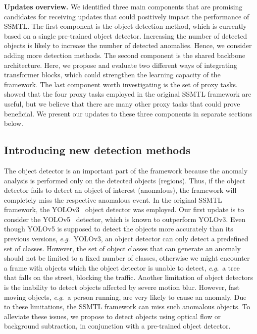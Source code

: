 \documentclass[times,twocolumn,final,authoryear]{elsarticle}
\newcommand{\eg}{\textit{e}.\textit{g}.}
\begin{document}
\noindent
\textbf{Updates overview.}
We identified three main components that are promising candidates for receiving updates that could positively impact the performance of SSMTL. The first component is the object detection method, which is currently based on a single pre-trained object detector. Increasing the number of detected objects is likely to increase the number of detected anomalies. Hence, we consider adding more detection methods. The second component is the shared backbone architecture. Here, we propose and evaluate two different ways of integrating transformer blocks, which could strengthen the learning capacity of the framework. The last component worth investigating is the set of proxy tasks. \cite{Georgescu-CVPR-2021} showed that the four proxy tasks employed in the original SSMTL framework are useful, but we believe that there are many other proxy tasks that could prove beneficial. We present our updates to these three components in separate sections below.

\subsection{Introducing new detection methods}


The object detector is an important part of the framework because the anomaly analysis is performed only on the detected objects (regions). Thus, if the object detector fails to detect an object of interest (anomalous), the framework will completely miss the respective anomalous event.
In the original SSMTL framework, the YOLOv3~\citep{Redmon-arXiv-2018} object detector was employed. Our first update is to consider the YOLOv5~\citep{Jocher-Z-2022} detector, which is known to outperform YOLOv3. Even though YOLOv5 is supposed to detect the objects more accurately than its previous versions, \eg~YOLOv3, an object detector can only detect a predefined set of classes. However, the set of object classes that can generate an anomaly should not be limited to a fixed number of classes, otherwise we might encounter a frame with objects which the object detector is unable to detect, \eg~a tree that falls on the street, blocking the traffic. Another limitation of object detectors is the inability to detect objects affected by severe motion blur. However, fast moving objects, \eg~a person running, are very likely to cause an anomaly. Due to these limitations, the SSMTL framework can miss such anomalous objects. To alleviate these issues, we propose to detect objects using optical flow or background subtraction, in conjunction with a pre-trained object detector. 
\end{document}
